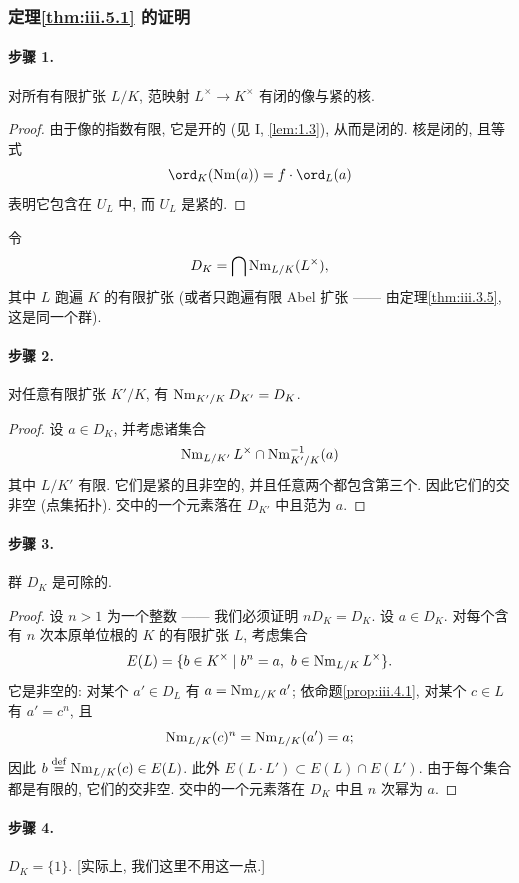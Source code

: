 \subsubsection*{定理\ref{thm:iii.5.1} 的证明}

\paragraph*{步骤 1.} 对所有有限扩张 $L/K$, 范映射 $L^\times\to K^\times$ 有闭的像与紧的核.

\begin{proof}
由于像的指数有限, 它是开的 (见 I, \ref{lem:1.3}), 从而是闭的. 核是闭的, 且等式
\[
 \ord_K(\Nm(a))=f\cdot\ord_L(a)
\]
表明它包含在 $U_L$ 中, 而 $U_L$ 是紧的.
\end{proof}

令
\[
 D_K=\bigcap \operatorname{Nm}_{L/K}(L^\times),
\]
其中 $L$ 跑遍 $K$ 的有限扩张 (或者只跑遍有限 Abel 扩张 —— 由定理\ref{thm:iii.3.5}, 这是同一个群).

\paragraph*{步骤 2.} 对任意有限扩张 $K'/K$, 有 $\operatorname{Nm}_{K'/K}D_{K'}=D_K$.

\begin{proof}
设 $a\in D_K$, 并考虑诸集合
\[
 \operatorname{Nm}_{L/K'}L^\times\cap\operatorname{Nm}_{K'/K}^{-1}(a)
\]
其中 $L/K'$ 有限. 它们是紧的且非空的, 并且任意两个都包含第三个. 因此它们的交非空 (点集拓扑). 交中的一个元素落在 $D_{K'}$ 中且范为 $a$.
\end{proof}

\paragraph*{步骤 3.} 群 $D_K$ 是可除的.

\begin{proof}
设 $n>1$ 为一个整数 —— 我们必须证明 $nD_K=D_K$. 设 $a\in D_K$. 对每个含有 $n$ 次本原单位根的 $K$ 的有限扩张 $L$, 考虑集合
\[
 E(L)=\{b\in K^\times\mid b^n=a,\ b\in\Nm_{L/K}L^\times\}.
\]
它是非空的: 对某个 $a'\in D_L$ 有 $a=\operatorname{Nm}_{L/K}a'$; 依命题\ref{prop:iii.4.1}, 对某个 $c\in L$ 有 $a'=c^n$, 且
\[
 \operatorname{Nm}_{L/K}(c)^n=\operatorname{Nm}_{L/K}(a')=a;
\]
因此 $b\stackrel{\mathrm{def}}{=}\operatorname{Nm}_{L/K}(c)\in E(L)$. 此外 $E(L\cdot L')\subset E(L)\cap E(L')$. 由于每个集合都是有限的, 它们的交非空. 交中的一个元素落在 $D_K$ 中且 $n$ 次幂为 $a$.
\end{proof}

\paragraph*{步骤 4.} $D_K=\{1\}$. [实际上, 我们这里不用这一点.]

